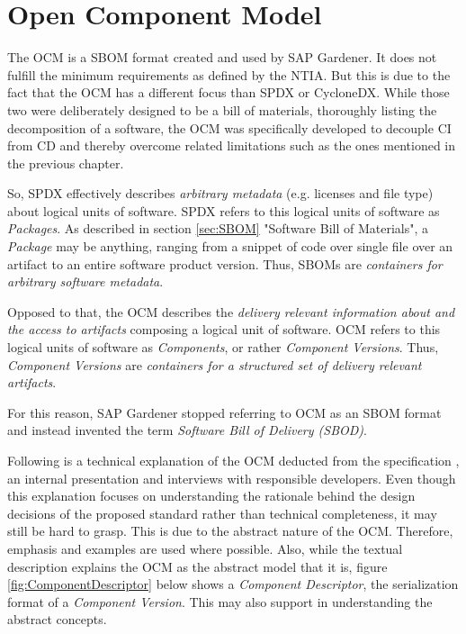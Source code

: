 \section{Open Component Model} \label{sec:Open Component Model}
The OCM is a SBOM format created and used by SAP Gardener. It does not fulfill the minimum requirements as defined by the NTIA. But this is due to the fact that the OCM has a different focus than SPDX or CycloneDX. While those two were deliberately designed to be a bill of materials, thoroughly listing the decomposition of a software, the OCM was specifically developed to decouple CI from CD and thereby overcome related limitations such as the ones mentioned in the previous chapter.\par 
So, SPDX effectively describes \emph{arbitrary metadata} (e.g. licenses and file type) about logical units of software. SPDX refers to this logical units of software as \emph{Packages}. As described in section \ref{sec:SBOM} "Software Bill of Materials", a \emph{Package} may be anything, ranging from a snippet of code over single file over an artifact to an entire software product version. Thus, SBOMs are \emph{containers for arbitrary software metadata}.\par
Opposed to that, the OCM describes the \emph{delivery relevant information about and the access to artifacts} composing a logical unit of software. OCM refers to this logical units of software as \emph{Components}, or rather \emph{Component Versions}. Thus, \emph{Component Versions} are  \emph{containers for a structured set of delivery relevant artifacts}.\par 
For this reason, SAP Gardener stopped referring to OCM as an SBOM format and instead invented the term \emph{Software Bill of Delivery (SBOD)}.\par
Following is a technical explanation of the OCM deducted from the specification \cite{OCMSpec}, an internal presentation \cite{OCMInternalPresentation} and interviews with responsible developers. Even though this explanation focuses on understanding the rationale behind the design decisions of the proposed standard rather than technical completeness, it may still be hard to grasp. This is due to the abstract nature of the OCM. Therefore, emphasis and examples are used where possible. Also, while the textual description explains the OCM as the abstract model that it is, figure \ref{fig:ComponentDescriptor} below shows a \emph{Component Descriptor}, the serialization format of a \emph{Component Version}. This may also support in understanding the abstract concepts.

